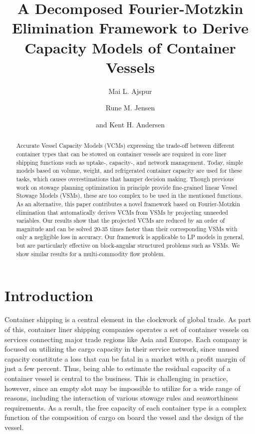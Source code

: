 \documentclass{llncs}
\begin{document}
\title{A Decomposed Fourier-Motzkin Elimination Framework to Derive Capacity Models of Container Vessels}
\author{Mai L. Ajspur \and Rune M. Jensen \and and Kent H. Andersen}

\maketitle

\begin{abstract}
Accurate Vessel Capacity Models (VCMs) expressing the trade-off between different container types that can be stowed on container vessels are required in core liner shipping functions such as uptake-, capacity-, and network management. Today, simple models based on volume, weight, and refrigerated container capacity are used for these tasks, which causes overestimations that hamper decision making.
Though previous work on stowage planning optimization in principle provide fine-grained linear Vessel Stowage Models (VSMs), these are too complex to be used in the mentioned functions. As an alternative, this paper contributes a novel framework based on Fourier-Motzkin elimination that automatically derives VCMs from VSMs by projecting unneeded variables. Our results show that the projected VCMs are reduced by an order of magnitude and can be solved 20-35 times faster than their corresponding VSMs with only a negligible loss in accuracy. 
Our framework is applicable to LP models in general, but are particularly effective on block-angular structured problems such as VSMs. We show similar results for a multi-commodity flow problem.
\end{abstract}

\setlength{\textfloatsep}{19.76pt plus 0.5pt minus 0.2pt}
\section{Introduction}
Container shipping is a central element in the clockwork of global trade. %
As part of this, container liner shipping companies operates a set of container vessels on services connecting major trade regions like Asia and Europe. Each company is focused on utilizing the cargo capacity in their service network, since unused capacity constitute a loss that can be fatal in a market with a profit margin of just a few percent. Thus, being able to estimate the residual capacity of a container vessel is central to the business. 
This is challenging in practice, however, since an empty slot may be impossible to utilize for a wide range of reasons, including the interaction of various stowage rules and seaworthiness requirements. As a result, the free capacity of each container type is a complex function of the composition of cargo on board the vessel and the design of the vessel. 
\end{document}
